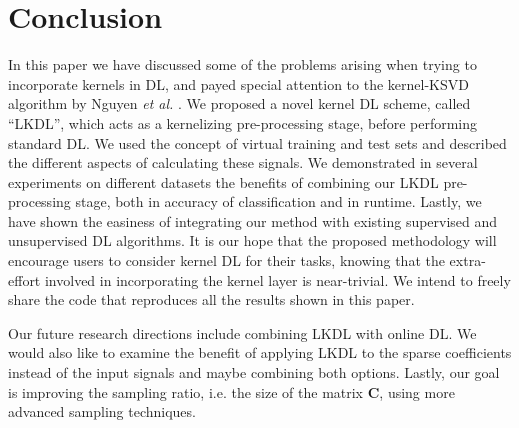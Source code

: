 \documentclass[journal]{IEEEtran}
\newcommand{\bC}{\mathbf{C}}
\begin{document}




\section{Conclusion} \label{Conclusion}

In this paper we have discussed some of the problems arising when trying to incorporate kernels in DL, and payed special attention to the kernel-KSVD algorithm by Nguyen \textit{et al.} \cite{KDL,KDL2}.
We proposed a novel kernel DL scheme, called ``LKDL'', which acts as a kernelizing pre-processing stage, before performing standard DL.
We used the concept of virtual training and test sets and described the different aspects of calculating these signals.
We demonstrated in several experiments on different datasets the benefits of combining our LKDL pre-processing stage, both in accuracy of classification and in runtime.
Lastly, we have shown the easiness of integrating our method with existing supervised and unsupervised DL algorithms. It is our hope that the proposed methodology will encourage users to consider kernel DL for their tasks, knowing that the extra-effort involved in incorporating the kernel layer is near-trivial. We intend to freely share the code that reproduces all the results shown in this paper.

Our future research directions include combining LKDL with online DL.
We would also like to examine the benefit of applying LKDL to the sparse coefficients instead of the input signals and maybe combining both options.
Lastly, our goal is improving the sampling ratio, i.e. the size of the matrix $\bC$, using more advanced sampling techniques.



\end{document}
